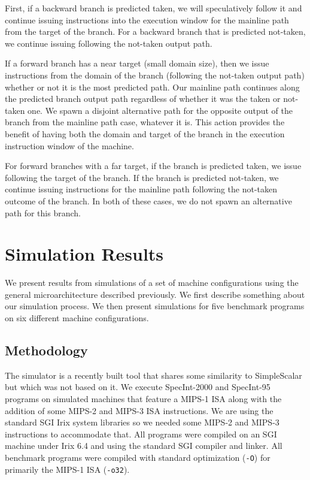 \documentclass[10pt,dvips]{article}
\begin{document}
First, if a backward branch is predicted taken,
we will speculatively follow it and continue issuing instructions
into the execution window for the mainline path from the target
of the branch.  
For a backward branch that
is predicted not-taken, we continue issuing following the
not-taken output path.

If a forward branch has a near target (small domain size), then we
issue instructions from the domain of the branch (following the
not-taken output path) whether or not it is the most predicted path.
Our mainline path continues along the predicted branch output path
regardless of whether it was the taken or not-taken one.  
We spawn a disjoint
alternative path for the opposite output of the branch from
the mainline path case, whatever it is.
This action
provides the benefit of having both the domain and target of the branch
in the execution instruction window of the machine.  

For forward branches with a far target,
if the branch is predicted taken, we issue following the target
of the branch.  If the branch is predicted not-taken, we continue
issuing instructions for the mainline path following the not-taken
outcome of the branch.  In both of these cases, we do not
spawn an alternative path for this branch.
%
\section{Simulation Results}
%
We present results from simulations of a set of machine configurations
using the general microarchitecture described previously.
We first describe something about our simulation process.
We then present simulations for five benchmark programs
on six different machine configurations.
%
\subsection{Methodology}
%
The simulator is a recently built tool that shares some similarity
to SimpleScalar \cite{Austin97} but which was not based on it.
We execute
SpecInt-2000 and SpecInt-95 programs on simulated machines
that feature a MIPS-1 ISA along with the addition of some MIPS-2 and
MIPS-3 ISA instructions.  We are using the standard SGI Irix system
libraries so we needed some MIPS-2 and MIPS-3 instructions to accommodate
that.  All programs were compiled on an SGI machine under Irix 6.4 and
using the standard SGI compiler and linker.  
All benchmark programs were compiled with
standard optimization ({\tt -O}) for primarily the MIPS-1 ISA ({\tt -o32}).
%
\end{document}
